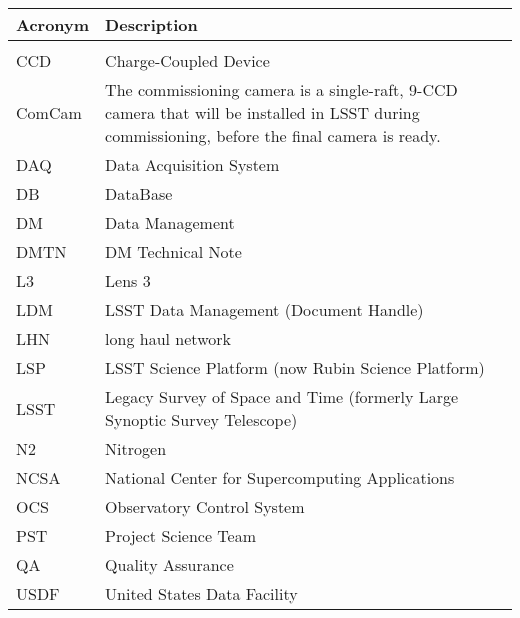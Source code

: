\addtocounter{table}{-1}
\begin{longtable}{p{}p{}}\hline
\textbf{Acronym} & \textbf{Description}  \\\hline

 &  \\\hline
CCD & Charge-Coupled Device \\\hline
ComCam & The commissioning camera is a single-raft, 9-CCD camera that will be installed in LSST during commissioning, before the final camera is ready. \\\hline
DAQ & Data Acquisition System \\\hline
DB & DataBase \\\hline
DM & Data Management \\\hline
DMTN & DM Technical Note \\\hline
L3 & Lens 3 \\\hline
LDM & LSST Data Management (Document Handle) \\\hline
LHN & long haul network \\\hline
LSP & LSST Science Platform (now Rubin Science Platform) \\\hline
LSST & Legacy Survey of Space and Time (formerly Large Synoptic Survey Telescope) \\\hline
N2 & Nitrogen \\\hline
NCSA & National Center for Supercomputing Applications \\\hline
OCS & Observatory Control System \\\hline
PST & Project Science Team \\\hline
QA & Quality Assurance \\\hline
USDF & United States Data Facility \\\hline
\end{longtable}
